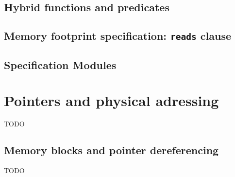 \absent


\subsection{Hybrid functions and predicates}
\label{sec:logicalstates}

\nodiff


\subsection{Memory footprint specification: \texorpdfstring{\lstinline|reads|}{reads} clause}

\absent


\subsection{Specification Modules}
\label{sec:specmodules}

\absent


\section{Pointers and physical adressing}
\label{sec:pointers}

TODO


\subsection{Memory blocks and pointer dereferencing}
\label{subsec:memory}

TODO


